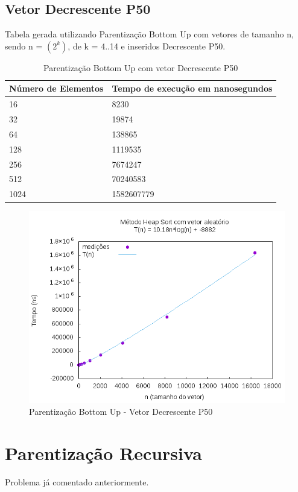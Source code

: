 \documentclass[12pt,a4paper,twoside]{report}
\begin{document}
\subsection{Vetor Decrescente P50}
Tabela gerada utilizando Parentização Bottom Up com vetores de tamanho n, sendo n = $(2^k)$, de k = 4..14 e inseridos Decrescente P50.
\begin{table}[H]
\centering
\caption{Parentização Bottom Up com vetor Decrescente P50}
\label{my-label}
\begin{tabular}{|l|l|}
\hline
\multicolumn{1}{|c|}{\textbf{Número de Elementos}} & \multicolumn{1}{c|}{\textbf{Tempo de execução em nanosegundos}} \\ \hline
16 & 8230 \\ \hline
32 & 19874 \\ \hline
64 & 138865 \\ \hline
128 & 1119535 \\ \hline
256 & 7674247 \\ \hline
512 & 70240583 \\ \hline
1024 & 1582607779 \\ \hline
\end{tabular}
\end{table}

\begin{figure}[H]
    \centering
    \includegraphics[width=0.7\linewidth]{graficos/HeapSort/vIntAleatorio/vIntAleatorio.png}
  \caption{Parentização Bottom Up - Vetor Decrescente P50}
\end{figure}

\section{Parentização Recursiva}

Problema já comentado anteriormente.
\end{document}
